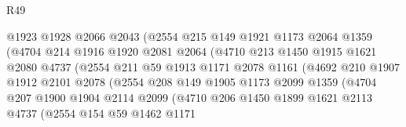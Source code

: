\begin{lexlean}{R49}
\begin{coremodule}
                            @1923
                            @1928
                            @2066
                            @2043
                            (@2554
                              @215
                              @149
                              @1921
                              @1173
                              @2064
                              @1359
                              (@4704
                                @214
                                @1916
                                @1920
                                @2081
                                @2064
                                (@4710
                                  @213
                                  @1450
                                  @1915
                                  @1621
                                  @2080
                                  @4737
                                  (@2554
                                    @211
                                    @59
                                    @1913
                                    @1171
                                    @2078
                                    @1161
                                    (@4692
                                      @210
                                      @1907
                                      @1912
                                      @2101
                                      @2078
                                      (@2554
                                        @208
                                        @149
                                        @1905
                                        @1173
                                        @2099
                                        @1359
                                        (@4704
                                          @207
                                          @1900
                                          @1904
                                          @2114
                                          @2099
                                          (@4710
                                            @206
                                            @1450
                                            @1899
                                            @1621
                                            @2113
                                            @4737
                                            (@2554
                                              @154
                                              @59
                                              @1462
                                              @1171

\end{coremodule}
\end{lexlean}
